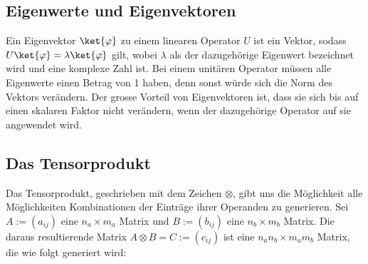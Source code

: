 \subsection{Eigenwerte und Eigenvektoren}
Ein Eigenvektor $\ket{\varphi}$ zu einem linearen Operator $U$ ist ein Vektor, sodass $U\ket{\varphi} = \lambda\ket{\varphi}$ gilt, wobei $\lambda$ als der dazugehörige Eigenwert bezeichnet wird und eine komplexe Zahl ist. Bei einem unitären Operator müssen alle Eigenwerte einen Betrag von 1 haben, denn sonst würde sich die Norm des Vektors verändern. Der grosse Vorteil von Eigenvektoren ist, dass sie sich bis auf einen skalaren Faktor nicht verändern, wenn der dazugehörige Operator auf sie angewendet wird.

\subsection{Das Tensorprodukt}
Das Tensorprodukt, geschrieben mit dem Zeichen $\otimes$, gibt uns die Möglichkeit alle Möglichkeiten Kombinationen der Einträge ihrer Operanden zu generieren. Sei $A := (a_{ij})$ eine $n_a \times m_a$ Matrix und $B := (b_{ij})$ eine $n_b \times m_b$ Matrix. Die daraus resultierende Matrix $A \otimes B = C := (c_{ij})$ ist eine $n_an_b \times m_am_b$ Matrix, die wie folgt generiert wird:

